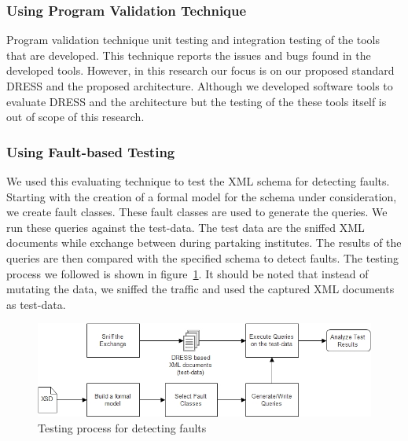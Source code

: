 \documentclass[12pt,a4paper,oneside]{book}
\begin{document}
		
		\subsubsection{Using Program Validation Technique}
		Program validation technique unit testing and integration testing of the tools that are developed. This technique reports the issues and bugs found in the developed tools. However, in this research our focus is on our proposed standard DRESS and the proposed architecture. Although we developed software tools to evaluate DRESS and the architecture but the testing of the these tools itself is out of scope of this research. 
		
		\subsubsection{Using Fault-based Testing}
		We used this evaluating technique to test the XML schema for detecting faults. Starting with the creation of a formal model for the schema under consideration, we create fault classes. These fault classes are used to generate the queries. We run these queries against the test-data. The test data are the sniffed XML documents while exchange between during partaking institutes. The results of the queries are then compared with the specified schema to detect faults. The testing process we followed is shown in figure~\ref{fig:fault-based-testing}. It should be noted that instead of mutating the data, we sniffed the traffic and used the captured XML documents as test-data.  		
		
\begin{figure}[!htp]
  \centering
  \includegraphics[width=13.5cm]{fault-based-testing.jpg}
  \caption{Testing process for detecting faults}
  \label{fig:fault-based-testing}
\end{figure}
	
\end{document}
